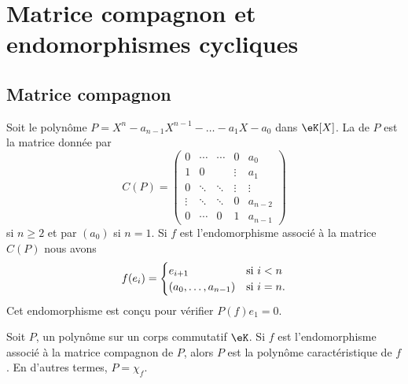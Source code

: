 \section{Matrice compagnon et endomorphismes cycliques}

\subsection{Matrice compagnon}

Soit le polynôme \( P=X^n-a_{n-1}X^{n-1}-\ldots-a_1X-a_0\) dans \( \eK[X]\). La  de \( P\) est la matrice donnée par
\begin{equation}
    C(P)=\begin{pmatrix}
        0    &   \cdots    &   \cdots    &   0    &   a_0\\  
        1    &   0    &       &   \vdots    &   a_1\\  
        0    &   \ddots    &   \ddots    &   \vdots    &   \vdots\\  
        \vdots    &   \ddots    &   \ddots    &   0    &   a_{n-2}\\  
        0    &   \cdots    &   0    &   1    &   a_{n-1}    
    \end{pmatrix}
\end{equation}
si \( n\geq 2\) et par \( (a_0)\) si \( n=1\). Si \( f\) est l'endomorphisme associé à la matrice \( C(P)\) nous avons
\begin{equation}
    f(e_i)=\begin{cases}
        e_{i+1}    &   \text{si \( i<n\)}\\
        (a_0,\ldots, a_{n-1})    &    \text{si \( i=n\)}.
    \end{cases}
\end{equation}
Cet endomorphisme est conçu pour vérifier \( P(f)e_1=0\).

\begin{lemma} \label{LemkVNisk}
    Soit \( P\), un polynôme sur un corps commutatif \( \eK\). Si \( f\) est l'endomorphisme associé à la matrice compagnon de \( P\), alors \( P\) est la polynôme caractéristique de \( f\). En d'autres termes, \( P=\chi_f\).
\end{lemma}

